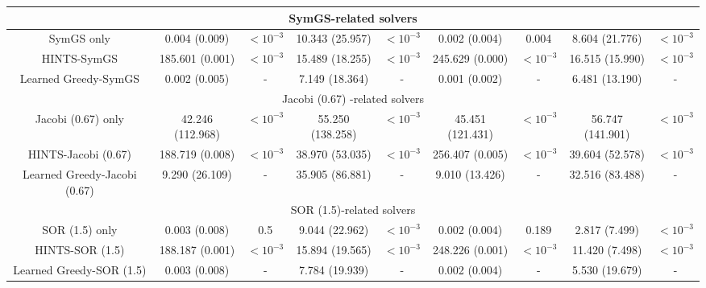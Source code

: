 \documentclass{article}
\begin{document}
\begin{table}[H]
{\begin{tabular}{ccccccccc}
\hline
         \multicolumn{9}{c}{SymGS-related solvers}\\
         \hline
SymGS only & 0.004 (0.009) & $<10^{-3}$ & 10.343 (25.957) & $<10^{-3}$ & 0.002 (0.004) & 0.004 & 8.604 (21.776) & $<10^{-3}$ \\
HINTS-SymGS & 185.601 (0.001) & $<10^{-3}$ & 15.489 (18.255) & $<10^{-3}$ & 245.629 (0.000) & $<10^{-3}$ & 16.515 (15.990) & $<10^{-3}$ \\
Learned Greedy-SymGS & 0.002 (0.005) & - & 7.149 (18.364) & - & 0.001 (0.002) & - & 6.481 (13.190) & -\\
\hline
         \multicolumn{9}{c}{Jacobi (0.67) -related solvers}\\
         \hline
Jacobi (0.67) only & 42.246 (112.968) & $<10^{-3}$ & 55.250 (138.258) & $<10^{-3}$ & 45.451 (121.431) & $<10^{-3}$ & 56.747 (141.901) & $<10^{-3}$ \\
HINTS-Jacobi (0.67) & 188.719 (0.008) & $<10^{-3}$ & 38.970 (53.035) & $<10^{-3}$ & 256.407 (0.005) & $<10^{-3}$ & 39.604 (52.578) & $<10^{-3}$ \\
Learned Greedy-Jacobi (0.67) & 9.290 (26.109) & - & 35.905 (86.881) & - & 9.010 (13.426) & - & 32.516 (83.488) & - \\
\hline
         \multicolumn{9}{c}{SOR (1.5)-related solvers}\\
         \hline
 SOR (1.5) only & 0.003 (0.008) & 0.5 & 9.044 (22.962) & $<10^{-3}$ & 0.002 (0.004) & 0.189 & 2.817 (7.499) & $<10^{-3}$ \\
HINTS-SOR (1.5) & 188.187 (0.001) & $<10^{-3}$ & 15.894 (19.565) & $<10^{-3}$ & 248.226 (0.001) & $<10^{-3}$ & 11.420 (7.498) & $<10^{-3}$ \\
Learned Greedy-SOR (1.5) & 0.003 (0.008) & - & 7.784 (19.939) & - & 0.002 (0.004) &  - & 5.530 (19.679) & - \\
\bottomrule
\end{tabular}}
    \label{tab:residualcomparison}
\end{table}
\end{document}
